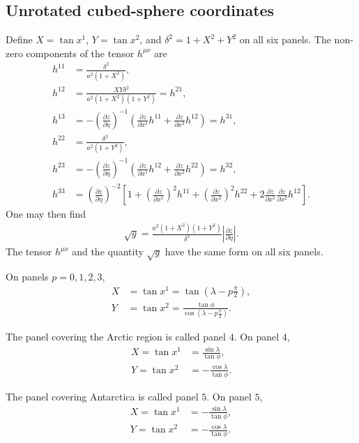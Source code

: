 \documentclass{article}
\begin{document}
\subsection{Unrotated cubed-sphere coordinates}
Define $X=\tan x^1$, $Y=\tan x^2$, and $\delta^2=1+X^2+Y^2$ on all six panels. The non-zero components of the tensor $h^{\mu \nu}$ are
\begin{align}
h^{11}&=\frac{\delta^2}{a^2(1+X^2)}, \\
h^{12}&=\frac{XY\delta^2}{a^2(1+X^2)(1+Y^2)}=h^{21}, \\
h^{13}&=-\left( \frac{\partial z}{\partial \eta} \right)^{-1} \left( \frac{\partial z}{\partial x^1} h^{11} + \frac{\partial z}{\partial x^2} h^{12} \right)=h^{31}, \\
h^{22}&=\frac{\delta^2}{a^2(1+Y^2)}, \\
h^{23}&=-\left( \frac{\partial z}{\partial \eta} \right)^{-1} \left( \frac{\partial z}{\partial x^1} h^{12} + \frac{\partial z}{\partial x^2} h^{22} \right)=h^{32}, \\
h^{33}&=\left( \frac{\partial z}{\partial \eta} \right)^{-2} \left[ 1 + \left( \frac{\partial z}{\partial x^1} \right)^2 h^{11} + \left( \frac{\partial z}{\partial x^2} \right)^2 h^{22} +2\frac{\partial z}{\partial x^1} \frac{\partial z}{\partial x^2} h^{12}\right].
\end{align}
One may then find
\begin{align}
\sqrt{g}=\frac{a^2 (1+X^2)(1+Y^2)}{\delta^3}\left|\frac{\partial z}{\partial\eta}\right|. \label{rgt}
\end{align}
The tensor $h^{\mu\nu}$ and the quantity $\sqrt{g}$ have the same form on all six panels.

On panels $p=0,1,2,3$,
\begin{align}
X&=\tan x^1 = \tan \left( \lambda -p\frac{\pi}{2} \right), \\
Y&=\tan x^2 = \frac{\tan \phi}{\cos \left( \lambda -p\frac{\pi}{2}\right)}.
\end{align}

The panel covering the Arctic region is called panel $4$. On panel $4$,
\begin{align}
X=\tan x^1&= \frac{\sin \lambda}{\tan \phi}, \\
Y=\tan x^2&=- \frac{\cos \lambda}{\tan \phi}.
\end{align}

The panel covering Antarctica is called panel $5$. On panel $5$,
\begin{align}
X=\tan x^1&=- \frac{\sin \lambda}{\tan \phi}, \\
Y=\tan x^2&=- \frac{\cos \lambda}{\tan \phi}.
\end{align}
\end{document}
